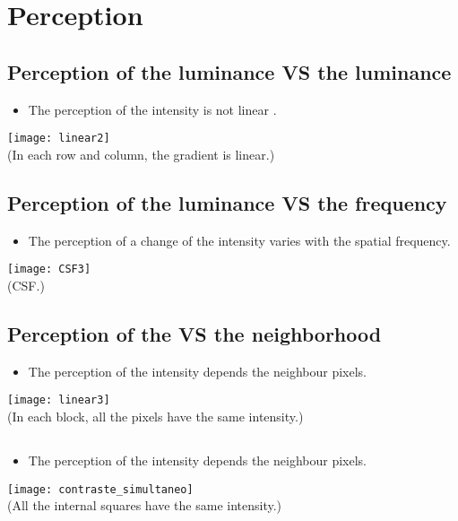 \chapter{Perception}

\section{Perception of the luminance VS the luminance}
\begin{itemize}
\item The perception of the intensity is not linear \cite{wikipedia_lightness}.
\end{itemize}
\begin{center}
  \texttt{[image: linear2]}\\
  (In each row and column, the gradient is linear.)
\end{center}

\section{Perception of the luminance VS the frequency}
\begin{itemize}
\item The perception of a change of the intensity varies with the spatial frequency.
\end{itemize}
\begin{center}
  \texttt{[image: CSF3]}\\
  (\gls{CSF}.)
\end{center}

\section{Perception of the  VS the neighborhood}
\begin{itemize}
\item The perception of the intensity depends the neighbour pixels.
\end{itemize}
\begin{center}
  \texttt{[image: linear3]}\\
  (In each block, all the pixels have the same intensity.)
\end{center}

\section*{}
\begin{itemize}
\item The perception of the intensity depends the neighbour pixels.
\end{itemize}
\begin{center}
  \texttt{[image: contraste\_simultaneo]}\\
  (All the internal squares have the same intensity.)
\end{center}

